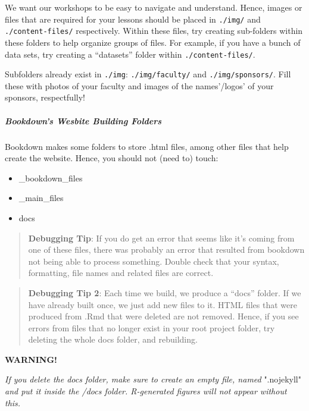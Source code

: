 \documentclass[
]{book}
\providecommand{\tightlist}{%
  \setlength{\itemsep}{0pt}\setlength{\parskip}{0pt}}
\newenvironment{redbox}{
  \definecolor{shadecolor}{RGB}{243, 154, 157}
  \color{white}
  \begin{shaded}}
 {\end{shaded}}
\theoremstyle{definition}
\theoremstyle{definition}
\theoremstyle{definition}
\theoremstyle{definition}
\theoremstyle{remark}
\begin{document}
We want our workshops to be easy to navigate and understand. Hence, images or files that are required for your lessons should be placed in \texttt{./img/} and \texttt{./content-files/} respectively. Within these files, try creating sub-folders within these folders to help organize groups of files. For example, if you have a bunch of data sets, try creating a ``datasets'' folder within \texttt{./content-files/}.

Subfolders already exist in \texttt{./img}: \texttt{./img/faculty/} and \texttt{./img/sponsors/}. Fill these with photos of your faculty and images of the names'/logos' of your sponsors, respectfully!

\subparagraph*{\texorpdfstring{ Bookdown's Wesbite Building Folders }{ Bookdown's Wesbite Building Folders }}\label{bookdowns-wesbite-building-folders}

Bookdown makes some folders to store .html files, among other files that help create the website. Hence, you should not (need to) touch:

\begin{itemize}
\tightlist
\item
  \_bookdown\_files
\item
  \_main\_files
\item
  docs
\end{itemize}

\begin{quote}
\textbf{Debugging Tip}: If you do get an error that seems like it's coming from one of these files, there was probably an error that resulted from bookdown not being able to process something. Double check that your syntax, formatting, file names and related files are correct.
\end{quote}

\begin{quote}
\textbf{Debugging Tip 2}: Each time we build, we produce a ``docs'' folder. If we have already built once, we just add new files to it. HTML files that were produced from .Rmd that were deleted are not removed. Hence, if you see errors from files that no longer exist in your root project folder, try deleting the whole docs folder, and rebuilding.
\end{quote}

\begin{redbox}

\begin{center}
\textbf{WARNING!}

\end{center}

\emph{If you delete the docs folder, make sure to create an empty file, named }".nojekyll" \emph{and put it inside the /docs folder. R-generated figures will not appear without this.}

\end{redbox}
\end{document}
